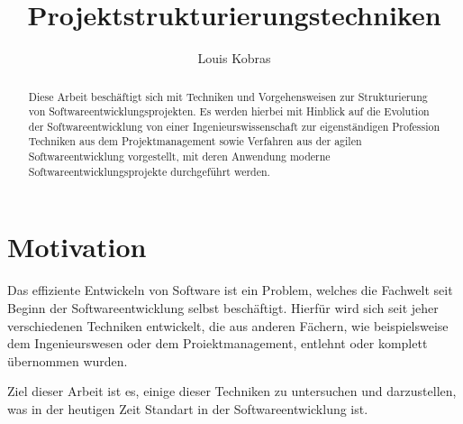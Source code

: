   
% 



      
\title{Projektstrukturierungstechniken}

\author{Louis Kobras}

      



\renewcommand{\textfraction}{0}

\maketitle



\begin{abstract}
	Diese Arbeit beschäftigt sich mit Techniken und Vorgehensweisen zur Strukturierung von Softwareentwicklungsprojekten.
	Es werden hierbei mit Hinblick auf die Evolution der Softwareentwicklung von einer Ingenieurswissenschaft zur eigenständigen Profession Techniken aus dem Projektmanagement sowie Verfahren aus der agilen Softwareentwicklung vorgestellt, mit deren Anwendung moderne Softwareentwicklungsprojekte durchgeführt werden.
	

\end{abstract}
\section{Motivation}
	\label{sec:motivation}
	Das effiziente Entwickeln von Software ist ein Problem, welches die Fachwelt seit Beginn der Softwareentwicklung selbst beschäftigt.
	Hierfür wird sich seit jeher verschiedenen Techniken entwickelt, die aus anderen Fächern, wie beispielsweise dem Ingenieurswesen oder dem Proiektmanagement, entlehnt oder komplett übernommen wurden.
	
	Ziel dieser Arbeit ist es, einige dieser Techniken zu untersuchen und darzustellen, was in der heutigen Zeit Standart in der Softwareentwicklung ist.
	
